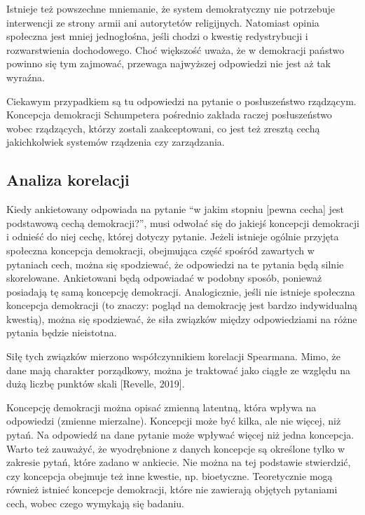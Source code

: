 \documentclass[12pt]{article}
\begin{document}
Istnieje też powszechne mniemanie, że system demokratyczny nie potrzebuje interwencji ze strony armii ani autorytetów religijnych. Natomiast opinia społeczna jest mniej jednogłośna, jeśli chodzi o kwestię redystrybucji i rozwarstwienia dochodowego. Choć większość uważa, że w demokracji państwo powinno się tym zajmować, przewaga najwyższej odpowiedzi nie jest aż tak wyraźna.

Ciekawym przypadkiem są tu odpowiedzi na pytanie o posłuszeństwo rządzącym. Koncepcja demokracji Schumpetera pośrednio zakłada raczej posłuszeństwo wobec rządzących, którzy zostali zaakceptowani, co jest też zresztą cechą jakichkolwiek systemów rządzenia czy zarządzania.

\hypertarget{analiza-korelacji}{%
\subsection{Analiza korelacji}\label{analiza-korelacji}}

Kiedy ankietowany odpowiada na pytanie ``w jakim stopniu {[}pewna cecha{]} jest podstawową cechą demokracji?'', musi odwołać się do jakiejś koncepcji demokracji i odnieść do niej cechę, której dotyczy pytanie. Jeżeli istnieje ogólnie przyjęta społeczna koncepcja demokracji, obejmująca część spośród zawartych w pytaniach cech, można się spodziewać, że odpowiedzi na te pytania będą silnie skorelowane. Ankietowani będą odpowiadać w podobny sposób, ponieważ posiadają tę samą koncepcję demokracji. Analogicznie, jeśli nie istnieje społeczna koncepcja demokracji (to znaczy: pogląd na demokrację jest bardzo indywidualną kwestią), można się spodziewać, że siła związków między odpowiedziami na różne pytania będzie nieistotna.

Siłę tych związków mierzono współczynnikiem korelacji Spearmana. Mimo, że dane mają charakter porządkowy, można je traktować jako ciągłe ze względu na dużą liczbę punktów skali {[}Revelle, 2019{]}.

Koncepcję demokracji można opisać zmienną latentną, która wpływa na odpowiedzi (zmienne mierzalne). Koncepcji może być kilka, ale nie więcej, niż pytań. Na odpowiedź na dane pytanie może wpływać więcej niż jedna koncepcja. Warto też zauważyć, że wyodrębnione z danych koncepcje są określone tylko w zakresie pytań, które zadano w ankiecie. Nie można na tej podstawie stwierdzić, czy koncepcja obejmuje też inne kwestie, np. bioetyczne. Teoretycznie mogą również istnieć koncepcje demokracji, które nie zawierają objętych pytaniami cech, wobec czego wymykają się badaniu.
\end{document}

